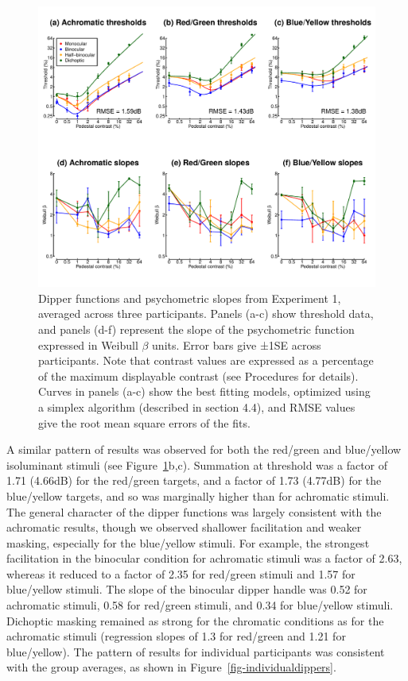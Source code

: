 \documentclass[
  letterpaper,
  DIV=11,
  numbers=noendperiod]{scrartcl}
\begin{document}
\begin{figure}

{\centering \includegraphics{Figures/dipperssimplex.pdf}

}

\caption{\label{fig-dipperfig}Dipper functions and psychometric slopes
from Experiment 1, averaged across three participants. Panels (a-c) show
threshold data, and panels (d-f) represent the slope of the psychometric
function expressed in Weibull \(\beta\) units. Error bars give ±1SE
across participants. Note that contrast values are expressed as a
percentage of the maximum displayable contrast (see Procedures for
details). Curves in panels (a-c) show the best fitting models, optimized
using a simplex algorithm (described in section 4.4), and RMSE values
give the root mean square errors of the fits.}

\end{figure}

A similar pattern of results was observed for both the red/green and
blue/yellow isoluminant stimuli (see Figure~\ref{fig-dipperfig}b,c).
Summation at threshold was a factor of 1.71 (4.66dB) for the red/green
targets, and a factor of 1.73 (4.77dB) for the blue/yellow targets, and
so was marginally higher than for achromatic stimuli. The general
character of the dipper functions was largely consistent with the
achromatic results, though we observed shallower facilitation and weaker
masking, especially for the blue/yellow stimuli. For example, the
strongest facilitation in the binocular condition for achromatic stimuli
was a factor of 2.63, whereas it reduced to a factor of 2.35 for
red/green stimuli and 1.57 for blue/yellow stimuli. The slope of the
binocular dipper handle was 0.52 for achromatic stimuli, 0.58 for
red/green stimuli, and 0.34 for blue/yellow stimuli. Dichoptic masking
remained as strong for the chromatic conditions as for the achromatic
stimuli (regression slopes of 1.3 for red/green and 1.21 for
blue/yellow). The pattern of results for individual participants was
consistent with the group averages, as shown in
Figure~\ref{fig-individualdippers}.
\end{document}

